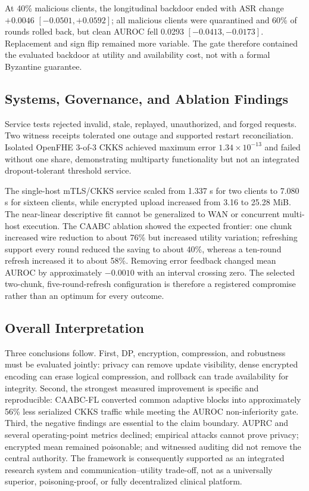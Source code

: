 \documentclass[conference]{IEEEtran}
\begin{document}
At 40\% malicious clients, the longitudinal backdoor ended with ASR change
$+0.0046$ $[-0.0501,+0.0592]$; all malicious clients were quarantined and 60\%
of rounds rolled back, but clean AUROC fell 0.0293 $[-0.0413,-0.0173]$.
Replacement and sign flip remained more variable. The gate therefore contained
the evaluated backdoor at utility and availability cost, not with a formal
Byzantine guarantee.

\subsection{Systems, Governance, and Ablation Findings}

Service tests rejected invalid, stale, replayed, unauthorized, and forged
requests. Two witness receipts tolerated one outage and supported restart
reconciliation. Isolated OpenFHE 3-of-3 CKKS achieved maximum error
$1.34\times10^{-13}$ and failed without one share, demonstrating multiparty
functionality but not an integrated dropout-tolerant threshold service.

The single-host mTLS/CKKS service scaled from 1.337 s for two clients to 7.080 s
for sixteen clients, while encrypted upload increased from 3.16 to 25.28 MiB.
The near-linear descriptive fit cannot be generalized to WAN or concurrent
multi-host execution. The CAABC ablation showed the expected frontier: one chunk
increased wire reduction to about 76\% but increased utility variation; refreshing
support every round reduced the saving to about 40\%, whereas a ten-round refresh
increased it to about 58\%. Removing error feedback changed mean AUROC by
approximately $-0.0010$ with an interval crossing zero. The selected two-chunk,
five-round-refresh configuration is therefore a registered compromise rather
than an optimum for every outcome.

\subsection{Overall Interpretation}

Three conclusions follow. First, DP, encryption, compression, and robustness
must be evaluated jointly: privacy can remove update visibility, dense encrypted
encoding can erase logical compression, and rollback can trade availability for
integrity. Second, the strongest measured improvement is specific and
reproducible: CAABC-FL converted common adaptive blocks into approximately 56\%
less serialized CKKS traffic while meeting the AUROC non-inferiority gate.
Third, the negative findings are essential to the claim boundary. AUPRC and
several operating-point metrics declined; empirical attacks cannot prove
privacy; encrypted mean remained poisonable; and witnessed auditing did not
remove the central authority. The framework is consequently supported as an
integrated research system and communication--utility trade-off, not as a
universally superior, poisoning-proof, or fully decentralized clinical platform.
\end{document}
